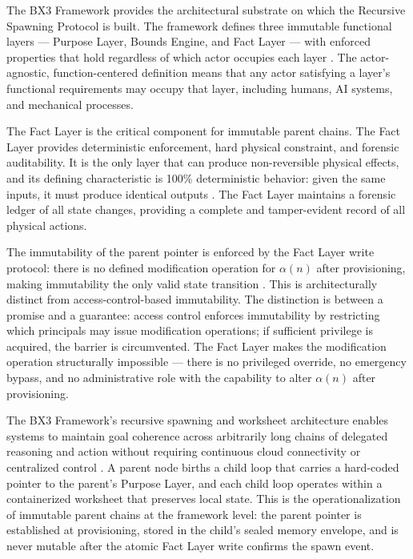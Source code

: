 The BX3 Framework provides the architectural substrate on which the Recursive Spawning Protocol is built. The framework defines three immutable functional layers — Purpose Layer, Bounds Engine, and Fact Layer — with enforced properties that hold regardless of which actor occupies each layer \cite{bx3whitepaper2026}. The actor-agnostic, function-centered definition means that any actor satisfying a layer's functional requirements may occupy that layer, including humans, AI systems, and mechanical processes.

The Fact Layer is the critical component for immutable parent chains. The Fact Layer provides deterministic enforcement, hard physical constraint, and forensic auditability. It is the only layer that can produce non-reversible physical effects, and its defining characteristic is 100\% deterministic behavior: given the same inputs, it must produce identical outputs \cite{bx3whitepaper2026}. The Fact Layer maintains a forensic ledger of all state changes, providing a complete and tamper-evident record of all physical actions.

The immutability of the parent pointer is enforced by the Fact Layer write protocol: there is no defined modification operation for $\alpha(n)$ after provisioning, making immutability the only valid state transition \cite{bx3whitepaper2026}. This is architecturally distinct from access-control-based immutability. The distinction is between a promise and a guarantee: access control enforces immutability by restricting which principals may issue modification operations; if sufficient privilege is acquired, the barrier is circumvented. The Fact Layer makes the modification operation structurally impossible — there is no privileged override, no emergency bypass, and no administrative role with the capability to alter $\alpha(n)$ after provisioning.

The BX3 Framework's recursive spawning and worksheet architecture enables systems to maintain goal coherence across arbitrarily long chains of delegated reasoning and action without requiring continuous cloud connectivity or centralized control \cite{bx3whitepaper2026}. A parent node births a child loop that carries a hard-coded pointer to the parent's Purpose Layer, and each child loop operates within a containerized worksheet that preserves local state. This is the operationalization of immutable parent chains at the framework level: the parent pointer is established at provisioning, stored in the child's sealed memory envelope, and is never mutable after the atomic Fact Layer write confirms the spawn event.

